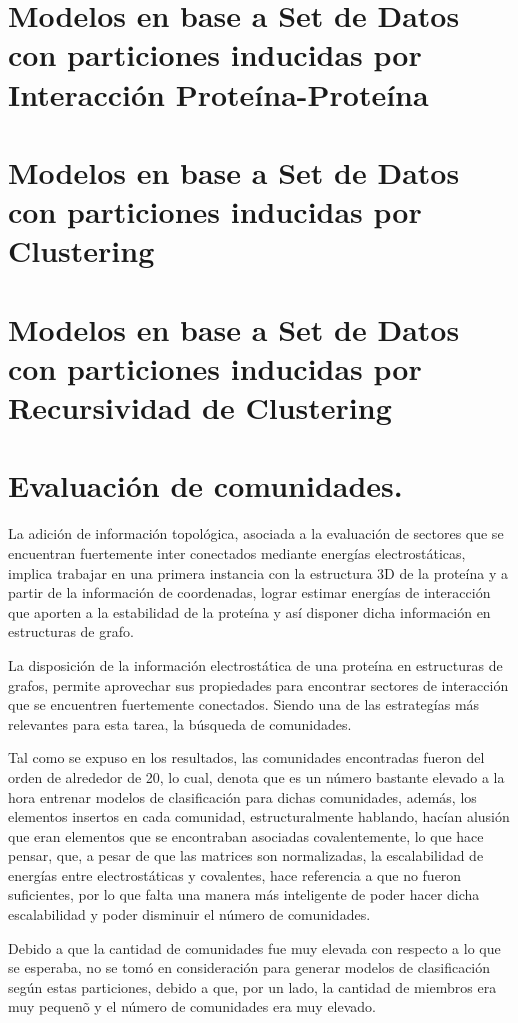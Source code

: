 \section{Modelos en base a Set de Datos con particiones inducidas por Interacci\'on Prote\'ina-Prote\'ina}

\section{Modelos en base a Set de Datos con particiones inducidas por Clustering}

\section{Modelos en base a Set de Datos con particiones inducidas por Recursividad de Clustering}

\section{Evaluaci\'on de comunidades.}

La adici\'on de informaci\'on topol\'ogica, asociada a la evaluaci\'on de sectores que se encuentran fuertemente inter conectados mediante energ\'ias electrost\'aticas, implica trabajar en una primera instancia con la estructura 3D de la prote\'ina y a partir de la informaci\'on de coordenadas, lograr estimar energ\'ias de interacci\'on que aporten a la estabilidad de la prote\'ina y as\'i disponer dicha informaci\'on en estructuras de grafo.

La disposici\'on de la informaci\'on electrost\'atica de una prote\'ina en estructuras de grafos, permite aprovechar sus propiedades para encontrar sectores de interacci\'on que se encuentren fuertemente conectados. Siendo una de las estrateg\'ias m\'as relevantes para esta tarea, la b\'usqueda de comunidades.

Tal como se expuso en los resultados, las comunidades encontradas fueron del orden de alrededor de 20, lo cual, denota que es un n\'umero bastante elevado a la hora entrenar modelos de clasificaci\'on para dichas comunidades, adem\'as, los elementos insertos en cada comunidad, estructuralmente hablando, hac\'ian alusi\'on que eran elementos que se encontraban asociadas covalentemente, lo que hace pensar, que, a pesar de que las matrices son normalizadas, la escalabilidad de energ\'ias entre electrost\'aticas y covalentes, hace referencia a que no fueron suficientes, por lo que falta una manera m\'as inteligente de poder hacer dicha escalabilidad y poder disminuir el n\'umero de comunidades.

Debido a que la cantidad de comunidades fue muy elevada con respecto a lo que se esperaba, no se tom\'o en consideraci\'on para generar modelos de clasificaci\'on seg\'un estas particiones, debido a que, por un lado, la cantidad de miembros era muy pequen\~o y el n\'umero de comunidades era muy elevado.
